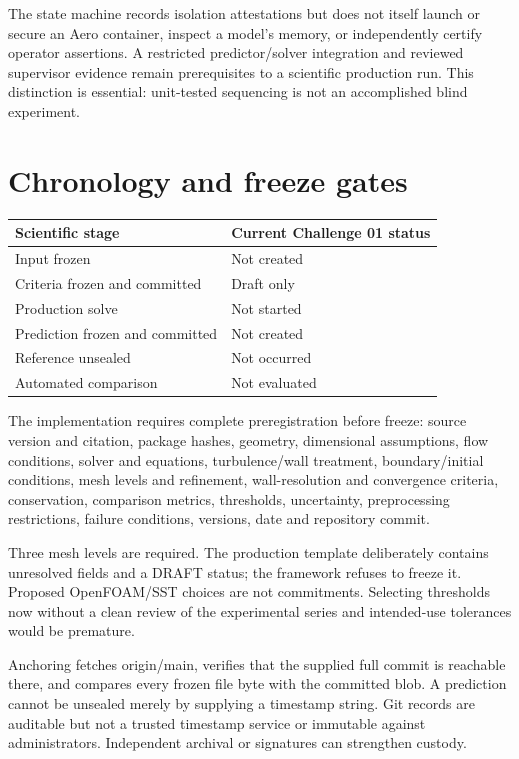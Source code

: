 \documentclass[10pt]{article}
\begin{document}
The state machine records isolation attestations but does not itself launch or secure an Aero container, inspect a model's memory, or independently certify operator assertions. A restricted predictor/solver integration and reviewed supervisor evidence remain prerequisites to a scientific production run. This distinction is essential: unit-tested sequencing is not an accomplished blind experiment.
\clearpage
\section{Chronology and freeze gates}
\begin{center}\begin{tabular}{ll}\toprule
Scientific stage & Current Challenge 01 status\\\midrule
Input frozen & Not created\\
Criteria frozen and committed & Draft only\\
Production solve & Not started\\
Prediction frozen and committed & Not created\\
Reference unsealed & Not occurred\\
Automated comparison & Not evaluated\\\bottomrule
\end{tabular}\end{center}
The implementation requires complete preregistration before freeze: source version and citation, package hashes, geometry, dimensional assumptions, flow conditions, solver and equations, turbulence/wall treatment, boundary/initial conditions, mesh levels and refinement, wall-resolution and convergence criteria, conservation, comparison metrics, thresholds, uncertainty, preprocessing restrictions, failure conditions, versions, date and repository commit.

Three mesh levels are required. The production template deliberately contains unresolved fields and a DRAFT status; the framework refuses to freeze it. Proposed OpenFOAM/SST choices are not commitments. Selecting thresholds now without a clean review of the experimental series and intended-use tolerances would be premature.

Anchoring fetches origin/main, verifies that the supplied full commit is reachable there, and compares every frozen file byte with the committed blob. A prediction cannot be unsealed merely by supplying a timestamp string. Git records are auditable but not a trusted timestamp service or immutable against administrators. Independent archival or signatures can strengthen custody.
\end{document}

